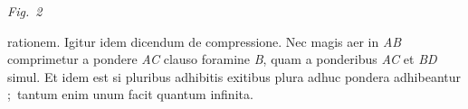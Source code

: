   \centerline{\lbrack\textit{Fig.~2}\rbrack}
\newpage
\pstart
\noindent%
 rationem. Igitur idem dicendum de compressione.\protect{}
Nec magis aer\protect{} in \textit{AB}
comprimetur a pondere \textit{AC}\protect{}
clauso foramine \textit{B},\protect{}
quam a ponderibus \textit{AC} et \textit{BD} simul.
Et idem est si pluribus adhibitis exitibus\protect{}
plura adhuc pondera\protect{} adhibeantur%
\lbrack;\rbrack\
tantum enim unum facit quantum infinita.
\pend%
%
  \newpage%
  \count{}
\count{}
\count{}
%
%
%
%